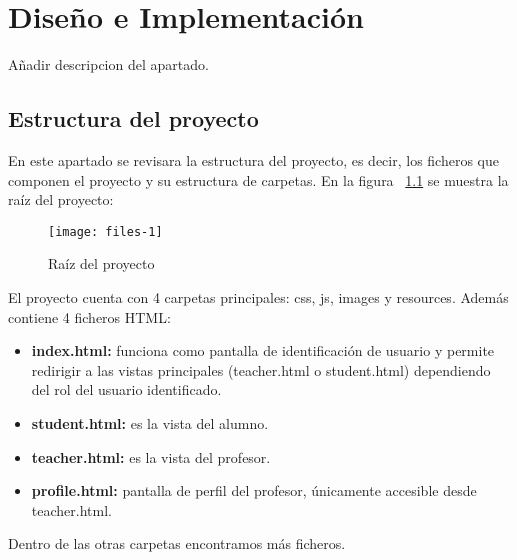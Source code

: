 
\chapter{Diseño e Implementación}
\label{diseno-e-implementacion}

Añadir descripcion del apartado.\\

\section{Estructura del proyecto}
\label{diseno-e-implementacion:estructura}

En este apartado se revisara la estructura del proyecto, es decir, los ficheros que componen el proyecto y su estructura de carpetas. En la figura ~\ref{fig:files-1} se muestra la raíz del proyecto:\\

\begin{figure}[h]
	\texttt{[image: files-1]}
	\caption{Raíz del proyecto}
	\label{fig:files-1}
\end{figure}

El proyecto cuenta con 4 carpetas principales: css, js, images y resources. Además contiene 4 ficheros HTML:

\begin{itemize}
\item \textbf{index.html:} funciona como pantalla de identificación de usuario y permite redirigir a las vistas principales (teacher.html o student.html) dependiendo del rol del usuario identificado.
\item \textbf{student.html:} es la vista del alumno.
\item \textbf{teacher.html:} es la vista del profesor.
\item \textbf{profile.html:} pantalla de perfil del profesor, únicamente accesible desde teacher.html.
\end{itemize}

Dentro de las otras carpetas encontramos más ficheros.

